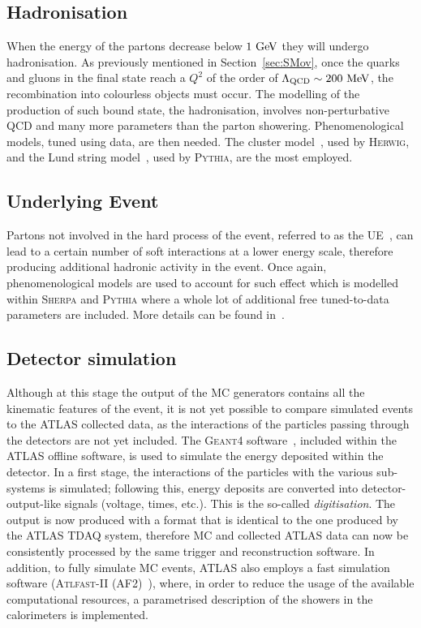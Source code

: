 		\subsection*{Hadronisation}

			When the energy of the partons decrease below $1 \GeV$ they will undergo hadronisation. As previously mentioned in Section~\ref{sec:SMov}, once the quarks and gluons in the final state reach a $Q^2$ of the order of $\Lambda_{\mathrm{QCD}} \sim 200 \MeV$, the recombination into colourless objects must occur. The modelling of the production of such bound state, the hadronisation, involves non-perturbative \ac{QCD} and many more parameters than the parton showering. Phenomenological models, tuned using data, are then needed. The cluster model~\cite{ClusterHerwig1999}, used by \textsc{Herwig}, and the Lund string model~\cite{LundModel2002}, used by \textsc{Pythia}, are the most employed. 

		\subsection*{Underlying Event}

			Partons not involved in the hard process of the event, referred to as the \ac{UE}~\cite{Field2008}, can lead to a certain number of soft interactions at a lower energy scale, therefore producing additional hadronic activity in the event. Once again, phenomenological models are used to account for such effect which is modelled within \textsc{Sherpa} and \textsc{Pythia} where a whole lot of additional free tuned-to-data parameters are included. More details can be found in~\cite{Field2008}.

		\subsection*{Detector simulation}
		\label{subsec:detSim}

			Although at this stage the output of the \ac{MC} generators contains all the kinematic features of the event, it is not yet possible to compare simulated events to the \ac{ATLAS} collected data, as the interactions of the particles passing through the detectors are not yet included. The \textsc{Geant4} software~\cite{Geant42003}, included within the \ac{ATLAS} offline software, is used to simulate the energy deposited within the detector. In a first stage, the interactions of the particles with the various sub-systems is simulated; following this, energy deposits are converted into detector-output-like signals (voltage, times, etc.). This is the so-called \emph{digitisation}. The output is now produced with a format that is identical to the one produced by the \ac{ATLAS} \acl{TDAQ} system, therefore \ac{MC} and collected \ac{ATLAS} data can now be consistently processed by the same trigger and reconstruction software. In addition, to fully simulate \ac{MC} events, \ac{ATLAS}	also employs a fast simulation software (\textsc{Atlfast-II} (AF2)~\cite{Lukas2012}), where, in order to reduce the usage of the available computational resources, a parametrised description of the showers in the calorimeters is implemented. 


